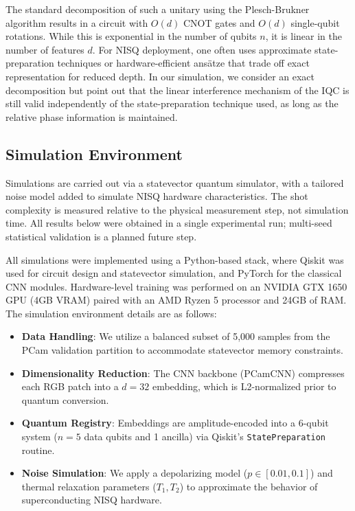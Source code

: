 \documentclass[conference]{IEEEtran}
\begin{document}
The standard decomposition of such a unitary using the Plesch-Brukner algorithm \cite{plesch2011quantum} results in a circuit with $O(d)$ CNOT gates and $O(d)$ single-qubit rotations. While this is exponential in the number of qubits $n$, it is linear in the number of features $d$. For NISQ deployment, one often uses approximate state-preparation techniques or hardware-efficient ans\"atze that trade off exact representation for reduced depth. In our simulation, we consider an exact decomposition but point out that the linear interference mechanism of the IQC is still valid independently of the state-preparation technique used, as long as the relative phase information is maintained.

\subsection{Simulation Environment}
Simulations are carried out via a statevector quantum simulator, with a tailored noise model added to simulate NISQ hardware characteristics. The shot complexity is measured relative to the physical measurement step, not simulation time. All results below were obtained in a single experimental run; multi-seed statistical validation is a planned future step.

All simulations were implemented using a Python-based stack, where Qiskit was used for circuit design and statevector simulation, and PyTorch for the classical CNN modules. Hardware-level training was performed on an NVIDIA GTX 1650 GPU (4GB VRAM) paired with an AMD Ryzen 5 processor and 24GB of RAM. The simulation environment details are as follows:
\begin{itemize}
    \item \textbf{Data Handling}: We utilize a balanced subset of 5,000 samples from the PCam validation partition to accommodate statevector memory constraints.
    \item \textbf{Dimensionality Reduction}: The CNN backbone (PCamCNN) compresses each RGB patch into a $d=32$ embedding, which is L2-normalized prior to quantum conversion.
    \item \textbf{Quantum Registry}: Embeddings are amplitude-encoded into a 6-qubit system ($n=5$ data qubits and 1 ancilla) via Qiskit's \texttt{StatePreparation} routine.
    \item \textbf{Noise Simulation}: We apply a depolarizing model ($p \in [0.01, 0.1]$) and thermal relaxation parameters ($T_1, T_2$) to approximate the behavior of superconducting NISQ hardware.
\end{itemize}
\end{document}
